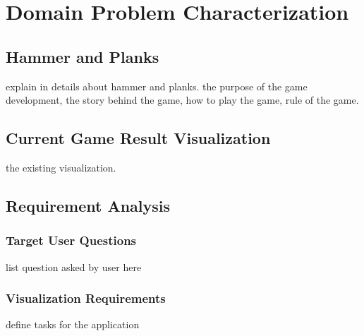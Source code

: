 \chapter{Domain Problem Characterization}
\label{chap:back}

\section{Hammer and Planks}
explain in details about hammer and planks. the purpose of the game development, the story behind the game, how to play the game, rule of the game. 
\section{Current Game Result Visualization}
the existing visualization.
\section{Requirement Analysis}
\subsection{Target User Questions}
list question asked by user here
\subsection{Visualization Requirements}
define tasks for the application
